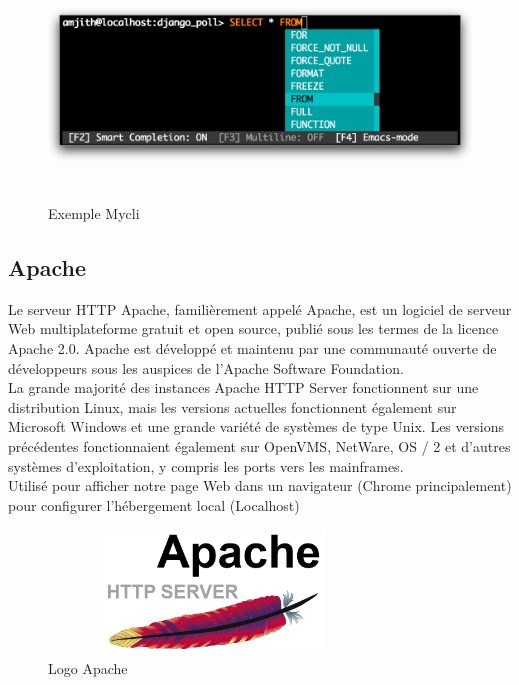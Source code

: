 \documentclass[12pt]{report}
\begin{document}
\begin{figure}[h]
\centering
    \includegraphics[width = 6in, height = 2.4in]{../Images/mycli.png}
\vspace{-0.1in}
\caption{Exemple Mycli}
\end{figure}

\newpage

\subsection{Apache}

Le serveur HTTP Apache, familièrement appelé Apache, est un logiciel de serveur Web multiplateforme gratuit et open source, publié sous les termes de la licence Apache 2.0. Apache est développé et maintenu par une communauté ouverte de développeurs sous les auspices de l'Apache Software Foundation.
\\
La grande majorité des instances Apache HTTP Server fonctionnent sur une distribution Linux, mais les versions actuelles fonctionnent également sur Microsoft Windows et une grande variété de systèmes de type Unix. Les versions précédentes fonctionnaient également sur OpenVMS, NetWare, OS / 2 et d'autres systèmes d'exploitation, y compris les ports vers les mainframes.
\\
Utilisé pour afficher notre page Web dans un navigateur (Chrome principalement) pour configurer l'hébergement local (Localhost)

\begin{figure}[h]
\centering
    \includegraphics[width = 3.4in, height = 1.3in]{../Images/Apache.png}
\caption{Logo Apache}
\end{figure}
\end{document}
